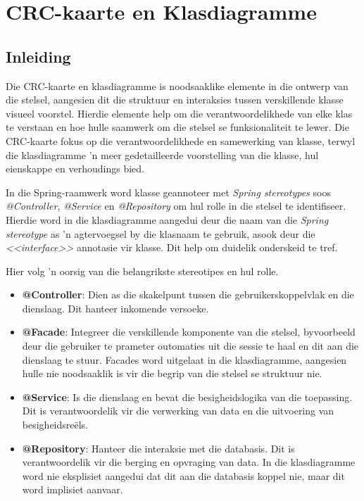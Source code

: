 \section{CRC-kaarte en Klasdiagramme}

\subsection{Inleiding}

Die \ac{CRC}-kaarte en klasdiagramme is noodsaaklike elemente in die ontwerp van die stelsel, aangesien dit die struktuur en interaksies tussen verskillende klasse visueel voorstel. Hierdie elemente help om die verantwoordelikhede van elke klas te verstaan en hoe hulle saamwerk om die stelsel se funksionaliteit te lewer. Die \ac{CRC}-kaarte fokus op die verantwoordelikhede en samewerking van klasse, terwyl die klasdiagramme 'n meer gedetailleerde voorstelling van die klasse, hul eienskappe en verhoudings bied.

In die Spring-raamwerk word klasse geannoteer met \textit{Spring stereotypes} soos \textit{@Controller}, \textit{@Service} en \textit{@Repository} om hul rolle in die stelsel te identifiseer. Hierdie word in die klasdiagramme aangedui deur die naam van die \textit{Spring stereotype} as 'n agtervoegsel by die klasnaam te gebruik, asook deur die \textit{<<interface>>} annotasie vir klasse. Dit help om duidelik onderskeid te tref.

Hier volg 'n oorsig van die belangrikste stereotipes en hul rolle.

\begin{itemize}
    \item \textbf{@Controller}: Dien as die skakelpunt tussen die gebruikerskoppelvlak en die dienslaag. Dit hanteer inkomende versoeke.
    \item \textbf{@Facade}: Integreer die verskillende komponente van die
    stelsel, byvoorbeeld deur die gebruiker te prameter outomaties uit die
    sessie te haal en dit aan die dienslaag te stuur. Facades word uitgelaat in
    die klasdiagramme, aangesien hulle nie noodsaaklik is vir die begrip van die stelsel se struktuur nie.
    \item \textbf{@Service}: Is die dienslaag en bevat die besigheidslogika van die toepassing. Dit is verantwoordelik vir die verwerking van data en die uitvoering van besigheidsreëls.
    \item \textbf{@Repository}: Hanteer die interaksie met die databasis. Dit is verantwoordelik vir die berging en opvraging van data. In die klasdiagramme word nie eksplisiet aangedui dat dit aan die databasis koppel nie, maar dit word implisiet aanvaar.
\end{itemize}

